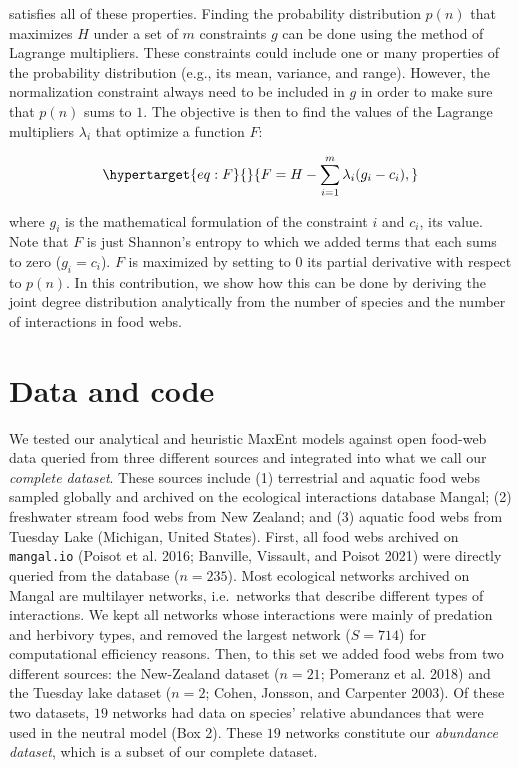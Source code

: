 \documentclass[11pt]{article}
\begin{document}
satisfies all of these properties. Finding the probability distribution
\(p(n)\) that maximizes \(H\) under a set of \(m\) constraints \(g\) can
be done using the method of Lagrange multipliers. These constraints
could include one or many properties of the probability distribution
(e.g., its mean, variance, and range). However, the normalization
constraint always need to be included in \(g\) in order to make sure
that \(p(n)\) sums to \(1\). The objective is then to find the values of
the Lagrange multipliers \(\lambda_i\) that optimize a function \(F\):

\begin{equation}\protect\hypertarget{eq:F}{}{F = H - \sum_{i=1}^m \lambda_i (g_i-c_i),}\label{eq:F}\end{equation}

where \(g_i\) is the mathematical formulation of the constraint \(i\)
and \(c_i\), its value. Note that \(F\) is just Shannon's entropy to
which we added terms that each sums to zero (\(g_i = c_i\)). \(F\) is
maximized by setting to \(0\) its partial derivative with respect to
\(p(n)\). In this contribution, we show how this can be done by deriving
the joint degree distribution analytically from the number of species
and the number of interactions in food webs.

\hypertarget{data-and-code}{%
\section{Data and code}\label{data-and-code}}

We tested our analytical and heuristic MaxEnt models against open
food-web data queried from three different sources and integrated into
what we call our \emph{complete dataset}. These sources include (1)
terrestrial and aquatic food webs sampled globally and archived on the
ecological interactions database Mangal; (2) freshwater stream food webs
from New Zealand; and (3) aquatic food webs from Tuesday Lake (Michigan,
United States). First, all food webs archived on \texttt{mangal.io}
(Poisot et al. 2016; Banville, Vissault, and Poisot 2021) were directly
queried from the database (\(n = 235\)). Most ecological networks
archived on Mangal are multilayer networks, i.e.~networks that describe
different types of interactions. We kept all networks whose interactions
were mainly of predation and herbivory types, and removed the largest
network (\(S = 714\)) for computational efficiency reasons. Then, to
this set we added food webs from two different sources: the New-Zealand
dataset (\(n = 21\); Pomeranz et al. 2018) and the Tuesday lake dataset
(\(n = 2\); Cohen, Jonsson, and Carpenter 2003). Of these two datasets,
\(19\) networks had data on species' relative abundances that were used
in the neutral model (Box 2). These \(19\) networks constitute our
\emph{abundance dataset}, which is a subset of our complete dataset.
\end{document}
